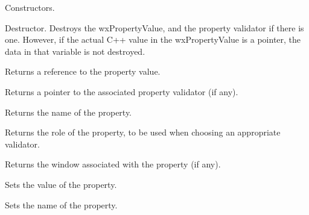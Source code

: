 

Constructors.



Destructor. Destroys the wxPropertyValue, and the property validator if there is one. However, if the
actual C++ value in the wxPropertyValue is a pointer, the data in that variable is not destroyed.



Returns a reference to the property value.



Returns a pointer to the associated property validator (if any).



Returns the name of the property.



Returns the role of the property, to be used when choosing an appropriate validator.



Returns the window associated with the property (if any).



Sets the value of the property.



Sets the name of the property.

